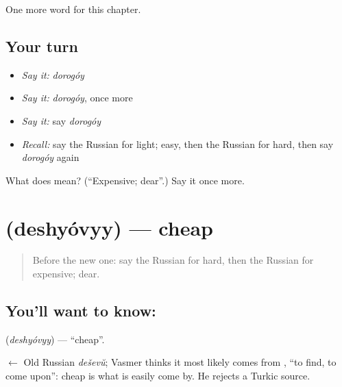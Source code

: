 \begin{grammarlens}[title={What you've built}]
One more word for this chapter.
\end{grammarlens}

\subsection*{Your turn}
\begin{itemize}
\raggedright
  \item \emph{Say it:} \emph{dorogóy}
  \item \emph{Say it:} \emph{dorogóy}, once more
  \item \emph{Say it:} say \emph{dorogóy}
  \item \emph{Recall:} say the Russian for light; easy, then the Russian for hard, then say \emph{dorogóy} again
\end{itemize}

\begin{tcolorbox}[breakable,colback=teal!4,colframe=teal!35!black,title={Before you move on}]
What does  mean? (\textquotedblleft{}Expensive; dear\textquotedblright{}.) Say it once more.
\end{tcolorbox}
\section[\texorpdfstring{\ru{дешёвый} (deshyóvyy)}{дешёвый (deshyóvyy)}]{ (deshyóvyy) — cheap}

\label{lesson:RU-C67-cheap}



\begin{quote}
Before the new one: say the Russian for hard, then the Russian for expensive; dear.
\end{quote}

\subsection*{You'll want to know: }
\textbf{} (\emph{deshyóvyy}) — \textquotedblleft{}cheap\textquotedblright{}.

\begin{cousinweb}
\textbf{} $\leftarrow$ Old Russian \emph{deševŭ}; Vasmer thinks it most likely comes from \emph{}, \textquotedblleft{}to find, to come upon\textquotedblright{}: cheap is what is easily come by. He rejects a Turkic source.
\end{cousinweb}

